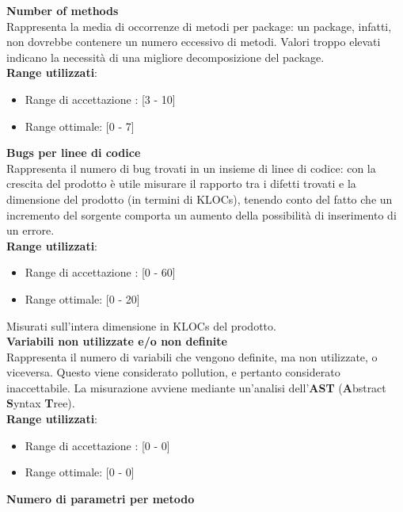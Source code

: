 \textbf{Number of methods}\\

Rappresenta la media di occorrenze di metodi per package: un package, infatti, non dovrebbe contenere un numero eccessivo di metodi. Valori troppo elevati indicano la necessità di una migliore decomposizione del package. \\

\textbf{Range utilizzati}:
\begin{itemize}
	\item Range di accettazione : [3 - 10]
	\item Range ottimale: [0 - 7]
\end{itemize}

\textbf{Bugs per linee di codice}\\

Rappresenta il numero di bug trovati in un insieme di linee di codice: con la crescita del prodotto è utile misurare il rapporto tra i difetti trovati e la dimensione del prodotto (in termini di KLOCs), tenendo conto del fatto che un incremento del sorgente comporta un aumento della possibilità di inserimento di un errore. \\

\textbf{Range utilizzati}:
\begin{itemize}
	\item Range di accettazione : [0 - 60]
	\item Range ottimale: [0 - 20]
\end{itemize}
Misurati sull'intera dimensione in KLOCs del prodotto.\\

\textbf{Variabili non utilizzate e/o non definite}\\

Rappresenta il numero di variabili che vengono definite, ma non utilizzate, o viceversa. Questo viene considerato pollution, e pertanto considerato inaccettabile. La misurazione avviene mediante un'analisi dell'\textbf{AST} (\textbf{A}bstract \textbf{S}yntax \textbf{T}ree). \\

\textbf{Range utilizzati}:
\begin{itemize}
	\item Range di accettazione : [0 - 0]
	\item Range ottimale: [0 - 0]
\end{itemize}


\textbf{Numero di parametri per metodo}\\

